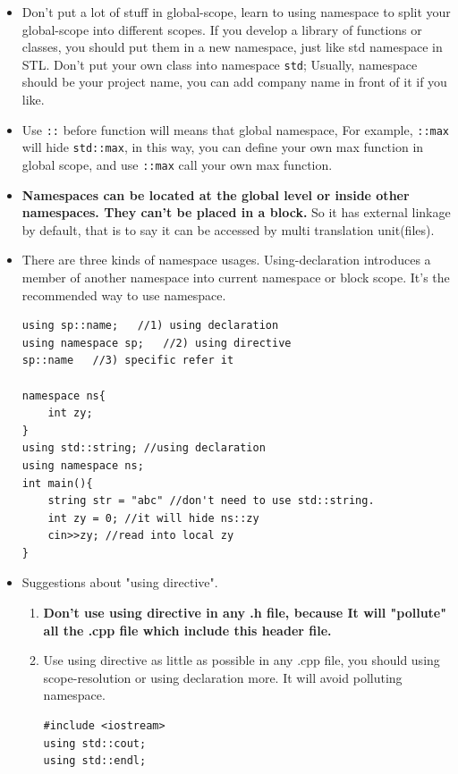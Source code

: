 \documentclass[a4paper,11pt,twoside]{book}
\begin{document}
\begin{itemize}
	\item Don't put a lot of stuff in global-scope, learn to using namespace to split your global-scope into different scopes. If you develop a library of functions or classes, you should put them in a new namespace, just like std namespace in STL. Don't put your own class into namespace \texttt{std}; Usually, namespace should be your project name, you can add company name in front of it if you like.
		
	\item Use \texttt{::} before function will means that global namespace, For example, \texttt{::max} will hide \texttt{std::max}, in this way, you can define your own max function in global scope, and use \texttt{::max} call your own max function. 
	
	\item \textbf{Namespaces can be located at the global level or inside other namespaces. They can't be placed in a block.} So it has external linkage by default, that is to say it can be accessed by multi translation unit(files).


	\item There are three kinds of namespace usages. Using-declaration introduces a member of another namespace into current namespace or block scope. It's the recommended way to use namespace. 
\begin{lstlisting}[numbers = none]
using sp::name;   //1) using declaration
using namespace sp;   //2) using directive
sp::name   //3) specific refer it
	
namespace ns{
	int zy;
}
using std::string; //using declaration
using namespace ns;
int main(){
	string str = "abc" //don't need to use std::string.
	int zy = 0; //it will hide ns::zy
	cin>>zy; //read into local zy
}
\end{lstlisting}

	\item Suggestions about "using directive".
\begin{enumerate}
	\item  \textbf{Don't use using directive in any .h file,  because It will "pollute" all the .cpp file which include this header file.}
	
	\item Use using directive as little as possible in any .cpp file, you should using scope-resolution or using declaration more. It will avoid polluting namespace.
\begin{lstlisting}[numbers=none]
#include <iostream>
using std::cout;
using std::endl;


\end{lstlisting}
\end{enumerate}
\end{itemize}
\end{document}
